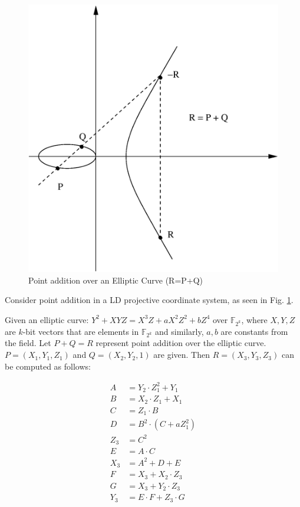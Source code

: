 \begin{figure}[h]
	\begin{center}
	\includegraphics[scale=0.50]{figures/ecc}
	\end{center}
	\caption{Point addition over an Elliptic Curve (R=P+Q)}
	\label{fig:ecc}
\end{figure}

\begin{Example}
Consider point addition in a LD projective coordinate system, 
as seen in Fig. \ref{fig:ecc}. 

Given an elliptic curve: $Y^2 + XYZ = X^3Z + aX^2Z^2 + bZ^4$ over $\mathbb{F}_{2^k}$, 
where $X,Y,Z$ are $k$-bit vectors
that are elements in $\mathbb{F}_{2^k}$ and similarly, 
$a, b$ are constants from the field. 
Let $P + Q = R$ represent point addition over the elliptic curve.
$P=(X_1, Y_1, Z_1)$ and $Q=(X_2, Y_2, 1)$ are given.
Then $R=(X_3, Y_3, Z_3)$ can be computed as follows:

\begin{align*}
A &= Y_2 \cdot Z_1^2 + Y_1 \\
B &= X_2 \cdot Z_1 + X_1 \\
C &= Z_1 \cdot B \\
D &= B^2 \cdot(C + a Z_1^2) \\
Z_3 &= C^2 \\
E &= A \cdot C  \\
X_3 &= A^2 + D + E  \\
F &= X_3 + X_2 \cdot Z_3 \\
G &= X_3 + Y_2\cdot Z_3 \\
Y_3 &= E\cdot F + Z_3 \cdot G \\
\end{align*}
\end{Example}

